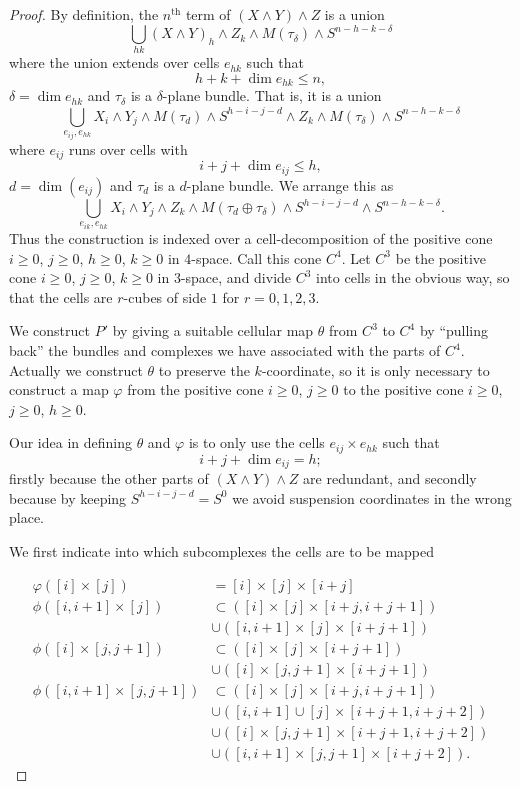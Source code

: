 \documentclass[../main]{subfiles}
\begin{document}
\begin{proof}
By definition, the $n^{\mathrm{th}}$ term of $(X \wedge Y) \wedge Z$ is a union \[\bigcup_{hk} (X \wedge Y)_h \wedge Z_k \wedge M(\tau_\delta) \wedge S^{n - h - k - \delta}\] where the union extends over cells $e_{hk}$ such that \[h + k + \dim e_{hk} \le n,\] $\delta = \dim e_{hk}$ and $\tau_\delta$ is a $\delta$-plane bundle. That is, it is a union \[\bigcup_{e_{ij}, e_{hk}} X_i \wedge Y_j \wedge M(\tau_d) \wedge S^{h - i - j - d} \wedge Z_k \wedge M(\tau_\delta) \wedge S^{n - h - k - \delta}\] where $e_{ij}$ runs over cells with \[i + j + \dim e_{ij} \le h,\] $d = \dim(e_{ij})$ and $\tau_d$ is a $d$-plane bundle. We arrange this as \[\bigcup_{e_{ik}, e_{hk}} X_i \wedge Y_j \wedge Z_k \wedge M(\tau_d \oplus \tau_\delta) \wedge S^{h - i - j - d} \wedge S^{n - h - k - \delta}.\] Thus the construction is indexed over a cell-decomposition of the positive cone $i \ge 0$, $j \ge 0$, $h \ge 0$, $k \ge 0$ in $4$-space. Call this cone $C^4$. Let $C^3$ be the positive cone $i \ge 0$, $j \ge 0$, $k \ge 0$ in $3$-space, and divide $C^3$ into cells in the obvious way, so that the cells are $r$-cubes of side $1$ for $r = 0, 1, 2, 3$. 

We construct $P'$ by giving a suitable cellular map $\theta$ from $C^3$ to $C^4$ by ``pulling back'' the bundles and complexes we have associated with the parts of $C^4$. Actually we construct $\theta$ to preserve the $k$-coordinate, so it is only necessary to construct a map $\varphi$ from the positive cone $i \ge 0$, $j \ge 0$ to the positive cone $i \ge 0$, $j \ge 0$, $h \ge 0$.

Our idea in defining $\theta$ and $\varphi$ is to only use the cells $e_{ij} \times e_{hk}$ such that \[i + j + \dim e_{ij} = h;\] firstly because the other parts of $(X \wedge Y) \wedge Z$ are redundant, and secondly because by keeping $S^{h - i - j - d} = S^0$ we avoid suspension coordinates in the wrong place.

 We first indicate into which subcomplexes the cells are to be mapped 

\begin{align*}
\varphi([i] \times [j]) & = [i] \times [j] \times [i + j] \\ \phi([i, i + 1] \times [j]) & \subset ([i] \times [j] \times [i + j, i + j + 1]) \\ & \cup ([i, i + 1] \times [j] \times [i + j + 1]) \\ \phi([i] \times [j, j + 1]) & \subset ([i] \times [j] \times [i + j + 1]) \\ & \cup ([i] \times [j, j + 1] \times [i + j + 1]) \\ \phi([i, i + 1] \times [j, j + 1]) & \subset ([i] \times [j] \times [i + j, i + j + 1]) \\ & \cup ([i, i + 1] \cup [j] \times [i + j + 1, i + j + 2]) \\ & \cup ([i] \times [j, j + 1] \times [i +j + 1, i + j + 2]) \\ & \cup ([i, i + 1] \times [j, j + 1] \times [i + j + 2]).
\end{align*}


\end{proof}
\end{document}
